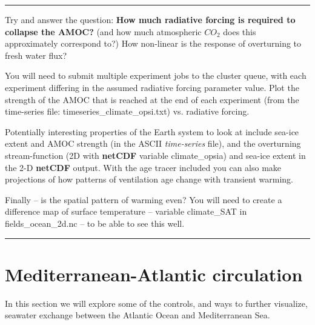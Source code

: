 \vspace{1mm}\noindent\rule{4cm}{0.5pt}\vspace{2mm}

\noindent Try and answer the question: \textbf{How much radiative forcing is required to collapse the AMOC?} (and how much atmospheric \(CO_{2}\) does this approximately correspond to?) How non-linear is the response of overturning to fresh water flux?

You will need to submit multiple experiment jobs to the cluster queue, with each experiment differing in the assumed radiative forcing parameter value. Plot the strength of the AMOC that is reached at the end of each experiment (from the time-series file: \textsf{\footnotesize timeseries\_climate\_opsi.txt}) vs. radiative forcing.

\vspace{1mm}
Potentially interesting properties of the Earth system to look at include sea-ice extent and AMOC strength (in the ASCII \textit{time-series} file), and the overturning stream-function (2D with \textbf{netCDF} variable \textsf{\footnotesize climate\_opsia}) and sea-ice extent in the 2-D \textbf{netCDF} output. With the age tracer included you can also make projections of how patterns of ventilation age change with transient warming.

Finally -- is the spatial pattern of warming even? You will need to create a difference map of surface temperature -- variable \textsf{\footnotesize climate\_SAT} in \textsf{\footnotesize fields\_ocean\_2d.nc} -- to be able to see this well.

\vspace{1mm}\noindent\rule{4cm}{0.5pt}\vspace{2mm}

\newpage

\section{Mediterranean-Atlantic circulation}


In this section we will explore some of the controls, and ways to further visualize, seawater exchange between the Atlantic Ocean and Mediterranean Sea.

